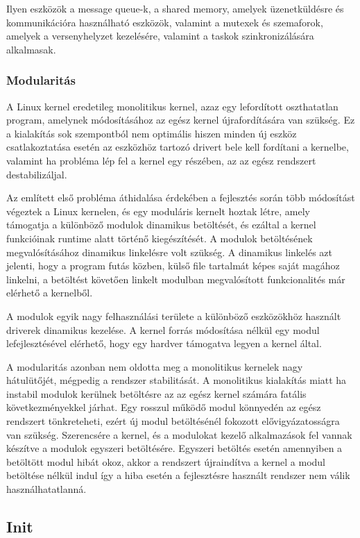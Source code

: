 Ilyen eszközök a message queue-k, a shared memory, amelyek üzenetküldésre és
kommunikációra használható eszközök, valamint a mutexek és szemaforok, amelyek a
versenyhelyzet kezelésére, valamint a taskok szinkronizálására alkalmasak.

\subsubsection{Modularitás}

A Linux kernel eredetileg monolitikus kernel, azaz egy lefordított oszthatatlan
program, amelynek módosításához az egész kernel újrafordítására van szükség. Ez a
kialakítás sok szempontból nem optimális hiszen minden új eszköz csatlakoztatása
esetén az eszközhöz tartozó drivert bele kell fordítani a kernelbe, valamint ha
probléma lép fel a kernel egy részében, az az egész rendszert destabilizáljal.

Az említett első probléma áthidalása érdekében a fejlesztés során több módosítást
végeztek a Linux kernelen, és egy moduláris kernelt hoztak létre, amely támogatja
a különböző modulok dinamikus betöltését, és ezáltal a kernel funkcióinak runtime
alatt történő kiegészítését. A modulok betöltésének megvalósításához dinamikus
linkelésre volt szükség. A dinamikus linkelés azt jelenti, hogy a program futás
közben, külső file tartalmát képes saját magához linkelni, a betöltést követően
linkelt modulban megvalósított funkcionalités már elérhető a kernelből.

A modulok egyik nagy felhasználási területe a különböző eszközökhöz használt
driverek dinamikus kezelése. A kernel forrás módosítása nélkül egy modul
lefejlesztésével elérhető, hogy egy hardver támogatva legyen a kernel által.

A modularitás azonban nem oldotta meg a monolitikus kernelek nagy hátulütőjét,
mégpedig a rendszer stabilitását. A monolitikus kialakítás miatt ha instabil
modulok kerülnek betöltésre az az egész kernel számára fatális következményekkel
járhat. Egy rosszul működő modul könnyedén az egész rendszert tönkreteheti, ezért
új modul betöltésénél fokozott elővigyázatosságra van szükség. Szerencsére a
kernel, és a modulokat kezelő alkalmazások fel vannak készítve a modulok egyszeri
betöltésére. Egyszeri betöltés esetén amennyiben a betöltött modul hibát okoz,
akkor a rendszert újraindítva a kernel a modul betöltése nélkül indul így a hiba
esetén a fejlesztésre használt rendszer nem válik használhatatlanná.

\subsection{Init}

